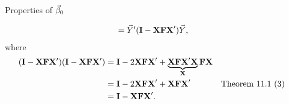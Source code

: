 \begin{Remark}{Properties of $ \vec{\beta}_0 $}{}
\begin{enumerate}[(1)]
\begin{align*}
                   & =\vec{Y}'(\mathbf{I}-\mathbf{XFX}')\vec{Y},
              \end{align*}
              where
              \begin{align*}
                  (\mathbf{I}-\mathbf{X}\mathbf{F}\mathbf{X}')(\mathbf{I}-\mathbf{X}\mathbf{F}\mathbf{X}')
                   & =\mathbf{I}-2\mathbf{XFX}'+\underbrace{\mathbf{XFX}'\mathbf{X}}_{\mathbf{X}}\mathbf{FX}                              \\
                   & =\mathbf{I}-2 \mathbf{XFX}'+\mathbf{XFX}'                                               &  & \text{Theorem 11.1 (3)} \\
                   & =\mathbf{I}-\mathbf{XFX}'.
              \end{align*}
    \end{enumerate}
\end{Remark}
